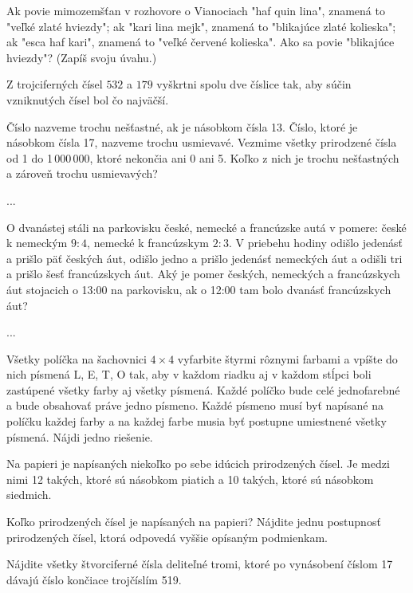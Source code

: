 {%
Ak povie mimozemšťan v rozhovore o Vianociach "haf quin lina", znamená to "veľké zlaté
hviezdy"; ak "kari lina mejk", znamená to "blikajúce zlaté kolieska"; ak "esca haf kari",
znamená to "veľké červené kolieska".
Ako sa povie "blikajúce hviezdy"? (Zapíš svoju úvahu.)}

{%
Z trojciferných čísel $532$ a $179$ vyškrtni spolu dve číslice tak, aby súčin vzniknutých čísel bol
čo najväčší.}

{%
Číslo nazveme trochu nešťastné, ak je násobkom čísla 13. Číslo, ktoré je násobkom čísla 17,
nazveme trochu usmievavé. Vezmime všetky prirodzené čísla od 1 do 1\,000\,000, ktoré
nekončia ani 0 ani 5. Koľko z nich je trochu nešťastných a zároveň trochu usmievavých?}

{%
...}

{%
O dvanástej stáli na parkovisku české, nemecké a francúzske autá v pomere: české
k nemeckým $9:4$, nemecké k francúzskym $2:3$. V priebehu hodiny odišlo jedenásť a prišlo päť
českých áut, odišlo jedno a prišlo jedenásť nemeckých áut a odišli tri a prišlo šesť
francúzskych áut. Aký je pomer českých, nemeckých a francúzskych áut stojacich o 13:00 na
parkovisku, ak o 12:00 tam bolo dvanásť francúzskych áut?}

{%
...}

{%
Všetky políčka na šachovnici $4\times4$ vyfarbite štyrmi rôznymi farbami a vpíšte do nich písmená
L, E, T, O tak, aby v každom riadku aj v každom stĺpci boli zastúpené všetky farby aj všetky
písmená. Každé políčko bude celé jednofarebné a bude obsahovať práve jedno písmeno.
Každé písmeno musí byť napísané na políčku každej farby a na každej farbe musia byť
postupne umiestnené všetky písmená. Nájdi jedno riešenie.}

{%
Na papieri je napísaných niekoľko po sebe idúcich prirodzených čísel. Je medzi nimi 12
takých, ktoré sú násobkom piatich a 10 takých, ktoré sú násobkom siedmich.
\begin{itemize}
 Koľko prirodzených čísel je napísaných na papieri?
 Nájdite jednu postupnosť prirodzených čísel, ktorá odpovedá vyššie opísaným
podmienkam.
\end{itemize}
}

{%
Nájdite všetky štvorciferné čísla deliteľné tromi, ktoré po vynásobení číslom 17 dávajú číslo
končiace trojčíslím 519.}

